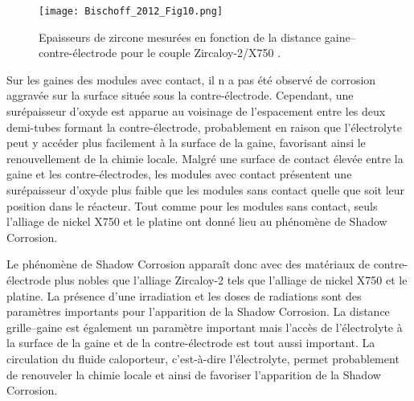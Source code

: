 \begin{refsection}
        \begin{figure}[H] 
            \centering
            \texttt{[image: Bischoff\_2012\_Fig10.png]} 
            \caption[Epaisseurs de zircone mesurées en fonction de la distance pour le couple Zircaloy-2/X750.]
            {Epaisseurs de zircone mesurées en fonction de la distance gaine--contre-électrode pour le couple Zircaloy-2/X750 \citep{Chatelain2000}.}
            \label{fig:oxide_thickness_vs_distance_non_contact_module} 
        \end{figure}

        
        Sur les gaines des modules avec contact, il n a pas été observé de corrosion aggravée
        sur la surface située sous la contre-électrode. Cependant, une surépaisseur
        d’oxyde est apparue au voisinage de l’espacement entre les deux demi-tubes formant la
        contre-électrode, probablement en raison que l’électrolyte peut y accéder
        plus facilement à la surface de la gaine, favorisant ainsi le renouvellement
        de la chimie locale. Malgré une surface de contact élevée entre la gaine et les
        contre-électrodes, les modules avec contact présentent une surépaisseur
        d’oxyde plus faible que les modules sans contact quelle que soit leur position
        dans le réacteur. Tout comme pour les modules sans contact, seuls l’alliage de
        nickel X750 et le platine ont donné lieu au phénomène de Shadow Corrosion.
        
        Le phénomène de Shadow Corrosion apparaît donc avec des matériaux de
        contre-électrode plus nobles que l'alliage Zircaloy-2 tels que l’alliage de nickel X750 et le platine.
        La présence d'une irradiation et les doses de radiations sont des paramètres importants pour l'apparition de la
        Shadow Corrosion.
        La distance grille--gaine est
        également un paramètre important mais l’accès de l’électrolyte à la surface de
        la gaine et de la contre-électrode est tout aussi important. La circulation du
        fluide caloporteur, c’est-à-dire l’électrolyte, permet probablement de renouveler la
        chimie locale et ainsi de favoriser l'apparition de la Shadow Corrosion.

        


\end{refsection}
